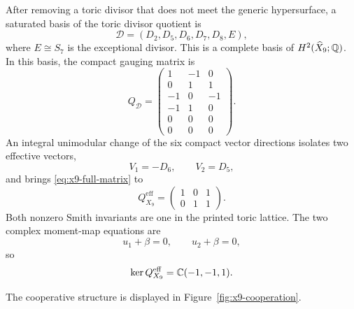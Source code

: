 After removing a toric divisor that does not meet the generic hypersurface, a
saturated basis of the toric divisor quotient is
\begin{equation}
 \mathcal D=(D_2,D_5,D_6,D_7,D_8,E),
 \label{eq:x9-divisor-basis}
\end{equation}
where $E\cong S_7$ is the exceptional divisor. This is a complete basis of
$H^2(\widehat X_9;\mathbb Q)$. In this basis, the compact gauging matrix is
\begin{equation}
 Q_{\mathcal D}
 =\begin{pmatrix}
  1&-1& 0\\
  0& 1& 1\\
 -1& 0&-1\\
 -1& 1& 0\\
  0& 0& 0\\
  0& 0& 0
 \end{pmatrix}.
 \label{eq:x9-full-matrix}
\end{equation}
An integral unimodular change of the six compact vector directions isolates
two effective vectors,
\begin{equation}
 V_1=-D_6,
 \qquad
 V_2=D_5,
 \label{eq:x9-effective-vectors}
\end{equation}
and brings \eqref{eq:x9-full-matrix} to
\begin{equation}
 Q_{X_9}^{\mathrm{eff}}
 =\begin{pmatrix}1&0&1\\0&1&1\end{pmatrix}.
 \label{eq:x9-effective-matrix}
\end{equation}
Both nonzero Smith invariants are one in the printed toric lattice. The two
complex moment-map equations are
\begin{equation}
 u_1+\beta=0,
 \qquad
 u_2+\beta=0,
 \label{eq:x9-moment-maps}
\end{equation}
so
\begin{equation}
 \ker Q_{X_9}^{\mathrm{eff}}
 =\mathbb C(-1,-1,1).
\label{eq:x9-kernel}
\end{equation}

The cooperative structure is displayed in
Figure~\ref{fig:x9-cooperation}.


